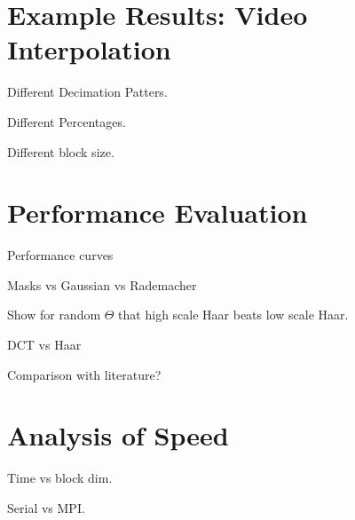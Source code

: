 
\section{Example Results: Video Interpolation}
Different Decimation Patters. 

Different Percentages. 

Different block size.

\section{Performance Evaluation}
Performance curves

Masks vs Gaussian vs Rademacher

Show for random $\Theta$ that high scale Haar beats low scale Haar. 

DCT vs Haar 

Comparison with literature?

\section{Analysis of Speed}
Time vs block dim.

Serial vs MPI.




